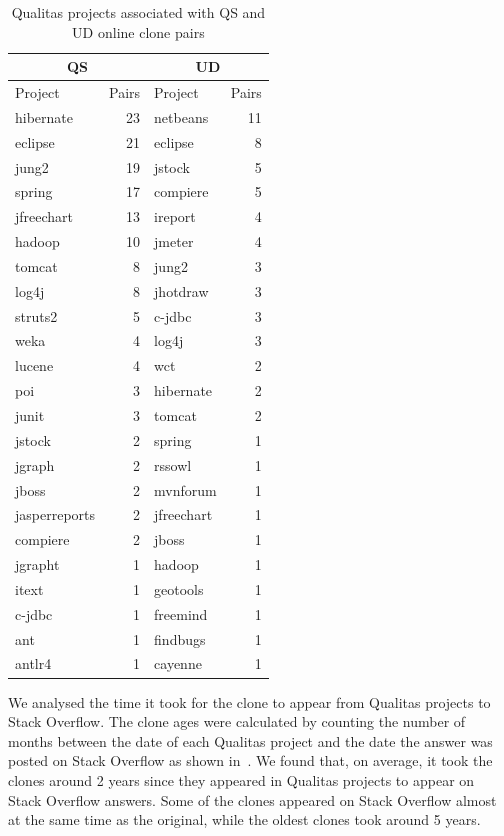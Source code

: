 \documentclass[10pt,journal,compsoc]{IEEEtran}
\begin{document}
\begin{table}
	\centering
	\caption{Qualitas projects associated with QS and UD online clone pairs}
	\label{tab:qs_qualitas_projects}
	\begin{tabular}{lrlr}
		\toprule
		\multicolumn{2}{c}{QS} & \multicolumn{2}{c}{UD} \\
		\midrule
		Project & Pairs & Project & Pairs\\
		\midrule
		hibernate & 23 & netbeans & 11 \\
		eclipse & 21 & eclipse & 8 \\
		jung2 & 19 & jstock & 5 \\
		spring & 17 & compiere & 5 \\
		jfreechart & 13 & ireport & 4 \\
		hadoop & 10 & jmeter & 4 \\
		tomcat & 8 & jung2 & 3 \\
		log4j & 8 & jhotdraw & 3 \\
		struts2 & 5 & c-jdbc & 3 \\
		weka & 4 & log4j & 3 \\
		lucene & 4 & wct & 2 \\
		poi & 3 & hibernate & 2 \\
		junit & 3 & tomcat & 2 \\
		jstock & 2 & spring & 1 \\
		jgraph & 2 & rssowl & 1 \\
		jboss & 2 & mvnforum & 1 \\
		jasperreports & 2 & jfreechart & 1 \\
		compiere & 2 & jboss & 1 \\
		jgrapht & 1 & hadoop & 1 \\
		itext & 1 & geotools & 1 \\
		c-jdbc & 1 & freemind & 1 \\
		ant & 1 & findbugs & 1 \\
		antlr4 & 1 & cayenne & 1 \\
		\bottomrule
	\end{tabular} 
\end{table}

We analysed the time it took for the clone to appear from Qualitas
projects to Stack Overflow. The clone ages were calculated by counting the
number of months between the date of each Qualitas project and the date the answer
was posted on Stack Overflow as shown in~.
We found that, on average, it took the clones around 2 years since they appeared
in Qualitas projects to appear on Stack Overflow answers. Some of the clones
appeared on Stack Overflow almost at the same time as the original, while the
oldest clones took around 5 years.
\end{document}

